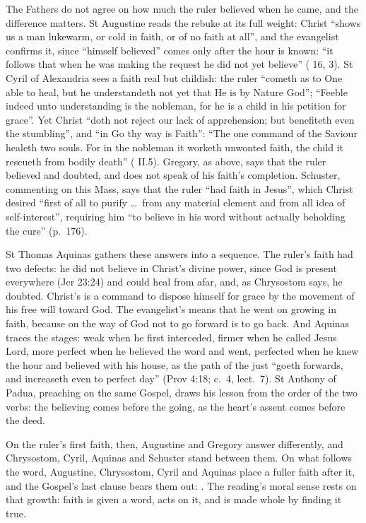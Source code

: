 The Fathers do not agree on how much the ruler believed when he came, and the
difference matters. St Augustine reads the rebuke at its full weight: Christ
``shows us a man lukewarm, or cold in faith, or of no faith at all'', and the
evangelist confirms it, since ``himself believed'' comes only after the hour is
known: ``it follows that when he was making the request he did not yet
believe'' ( 16, 3). St Cyril of Alexandria sees a faith
real but childish: the ruler ``cometh as to One able to heal, but he
understandeth not yet that He is by Nature God''; ``Feeble indeed unto
understanding is the nobleman, for he is a child in his petition for grace''.
Yet Christ ``doth not reject our lack of apprehension; but benefiteth even the
stumbling'', and ``in Go thy way is Faith'': ``The one command of the Saviour
healeth two souls. For in the nobleman it worketh unwonted faith, the child it
rescueth from bodily death'' ( II.5). Gregory, as
above, says that the ruler believed and doubted, and does not speak of his
faith's completion. Schuster, commenting on this Mass, says that the ruler ``had
faith in Jesus'', which Christ desired ``first of all to purify \dots\ from any
material element and from all idea of self-interest'', requiring him ``to
believe in his word without actually beholding the cure'' (p.~176).

St Thomas Aquinas gathers these answers into a sequence. The ruler's faith had
two defects: he did not believe in Christ's divine power, since God is present
everywhere (Jer 23:24) and could heal from afar, and, as Chrysostom says, he
doubted. Christ's  is a command to dispose himself for grace by the
movement of his free will toward God. The evangelist's  means
that he went on growing in faith, because on the way of God not to go forward is
to go back. And Aquinas traces the stages: weak when he first interceded,
firmer when he called Jesus Lord, more perfect when he believed the word and
went, perfected when he knew the hour and believed with his house, as the path
of the just ``goeth forwards, and increaseth even to perfect day'' (Prov 4:18;
 c.~4, lect.~7). St Anthony of Padua, preaching on the same
Gospel, draws his lesson from the order of the two verbs: the believing comes
before the going, as the heart's assent comes before the deed.

On the ruler's first faith, then, Augustine and Gregory answer differently,
and Chrysostom, Cyril, Aquinas and Schuster stand between them. On what follows
the word, Augustine, Chrysostom, Cyril and Aquinas place a fuller faith after
it, and the Gospel's last clause bears them out: . The reading's moral sense rests on that growth: faith is
given a word, acts on it, and is made whole by finding it true.

